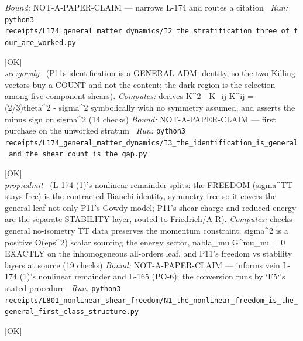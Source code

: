 \begin{description}
 \emph{Bound:} NOT-A-PAPER-CLAIM --- narrows L-174 and routes a citation
\ \emph{Run:} \texttt{python3 receipts/L174\_general\_matter\_dynamics/I2\_the\_stratification\_three\_of\_four\_are\_worked.py}
\item[\label{rcpt:I3_the_identification_is_general_and_the_shear_count_is_the_gap}\textbf{}\quad\texttt{I3\_the\_identification\_is\_general\_and\_the\_shear\_count\_is\_the\_gap}]\hfill\textsf{[OK]}\\
\textit{sec:gowdy} \ (P11s identification is a GENERAL ADM identity, so the two Killing vectors buy a COUNT and not the content; the dark region is the selection among five-component shears). 
\emph{Computes:} derives K\textasciicircum{}2 - K\_ij K\textasciicircum{}ij = (2/3)theta\textasciicircum{}2 - sigma\textasciicircum{}2 symbolically with no symmetry assumed, and asserts the minus sign on sigma\textasciicircum{}2 (14 checks)
 \emph{Bound:} NOT-A-PAPER-CLAIM --- first purchase on the unworked stratum
\ \emph{Run:} \texttt{python3 receipts/L174\_general\_matter\_dynamics/I3\_the\_identification\_is\_general\_and\_the\_shear\_count\_is\_the\_gap.py}
\item[\label{rcpt:N1_the_nonlinear_freedom_is_the_general_first_class_structure}\textbf{}\quad\texttt{N1\_the\_nonlinear\_freedom\_is\_the\_general\_first\_class\_structure}]\hfill\textsf{[OK]}\\
\textit{prop:admit} \ (L-174 (1)'s nonlinear remainder splits: the FREEDOM (sigma\textasciicircum{}TT stays free) is the contracted Bianchi identity, symmetry-free so it covers the general leaf not only P11's Gowdy model; P11's shear-charge and reduced-energy are the separate STABILITY layer, routed to Friedrich/A-R). 
\emph{Computes:} checks general no-isometry TT data preserves the momentum constraint, sigma\textasciicircum{}2 is a positive O(eps\textasciicircum{}2) scalar sourcing the energy sector, nabla\_mu G\textasciicircum{}mu\_nu = 0 EXACTLY on the inhomogeneous all-orders leaf, and P11's freedom vs stability layers at source (19 checks)
 \emph{Bound:} NOT-A-PAPER-CLAIM --- informs vein L-174 (1)'s nonlinear remainder and L-165 (PO-6); the conversion runs by `F5`'s stated procedure
\ \emph{Run:} \texttt{python3 receipts/L801\_nonlinear\_shear\_freedom/N1\_the\_nonlinear\_freedom\_is\_the\_general\_first\_class\_structure.py}
\item[\label{rcpt:I10_the_constraint_propagation_is_symmetry_free}\textbf{}\quad\texttt{I10\_the\_constraint\_propagation\_is\_symmetry\_free}]\hfill\textsf{[OK]}\\

\end{description}
